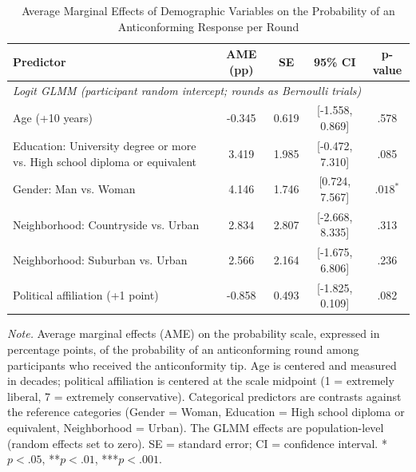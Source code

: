 \begin{table}[H]
\centering
\caption{Average Marginal Effects of Demographic Variables on the Probability of an Anticonforming Response per Round}
\label{tab:ame_antic_demog_round}
\begingroup
\footnotesize
\renewcommand{\arraystretch}{0.90}

\begin{tabularx}{\linewidth}{Xcccc}
\toprule
\textbf{Predictor} & \textbf{AME (pp)} & \textbf{SE} & \textbf{95\% CI} & \textbf{p-value} \\
\midrule
\multicolumn{5}{l}{\textit{Logit GLMM (participant random intercept; rounds as Bernoulli trials)}} \\
Age (+10 years) & -0.345 & 0.619 & [-1.558, 0.869] & .578 \\
Education: University degree or more vs. High school diploma or equivalent & 3.419 & 1.985 & [-0.472, 7.310] & .085 \\
Gender: Man vs. Woman & 4.146 & 1.746 & [0.724, 7.567] & $.018^{\text{*}}$ \\
Neighborhood: Countryside vs. Urban & 2.834 & 2.807 & [-2.668, 8.335] & .313 \\
Neighborhood: Suburban vs. Urban & 2.566 & 2.164 & [-1.675, 6.806] & .236 \\
Political affiliation (+1 point) & -0.858 & 0.493 & [-1.825, 0.109] & .082 \\
\bottomrule
\end{tabularx}

\vspace{0.6em}
{\footnotesize
\setlength{\baselineskip}{12pt}
\textit{Note.} Average marginal effects (AME) on the probability scale, expressed in percentage points, of the probability of an anticonforming round among participants who received the anticonformity tip. Age is centered and measured in decades; political affiliation is centered at the scale midpoint (1 = extremely liberal, 7 = extremely conservative). Categorical predictors are contrasts against the reference categories (Gender = Woman, Education = High school diploma or equivalent, Neighborhood = Urban). The GLMM effects are population-level (random effects set to zero). SE = standard error; CI = confidence interval. *$p < .05$, **$p < .01$, ***$p < .001$.
\par}
\endgroup
\end{table}
